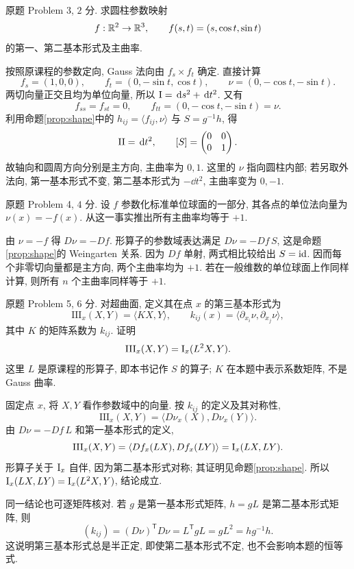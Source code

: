 \begin{exercise}\label{ps:4-3}
原题 Problem 3, $2$ 分. 求圆柱参数映射
\[
 f:\mathbb R^2\to\mathbb R^3,\qquad f(s,t)=(s,\cos t,\sin t)
\]
的第一、第二基本形式及主曲率.
\end{exercise}
\begin{solution}
按照原课程的参数定向, Gauss 法向由 $f_s\times f_t$ 确定. 直接计算
\[
 f_s=(1,0,0),\qquad f_t=(0,-\sin t,\cos t),\qquad
 \nu=(0,-\cos t,-\sin t).
\]
两切向量正交且均为单位向量, 所以 $\mathrm{I}=\,\mathrm d s^2+\,\mathrm d t^2$. 又有
\[
 f_{ss}=f_{st}=0,\qquad f_{tt}=(0,-\cos t,-\sin t)=\nu.
\]
利用命题\ref{prop:shape}中的 $h_{ij}=\langle f_{ij},\nu\rangle$ 与 $S=g^{-1}h$, 得
\[
 \mathrm{II}=\,\mathrm d t^2,\qquad
 [S]=\begin{pmatrix}0&0\\0&1\end{pmatrix}.
\]
故轴向和圆周方向分别是主方向, 主曲率为 $0,1$. 这里的 $\nu$ 指向圆柱内部; 若另取外法向, 第一基本形式不变, 第二基本形式为 $-\dd t^2$, 主曲率变为 $0,-1$.
\end{solution}

\begin{exercise}\label{ps:4-4}
原题 Problem 4, $4$ 分. 设 $f$ 参数化标准单位球面的一部分, 其各点的单位法向量为 $\nu(x)=-f(x)$. 从这一事实推出所有主曲率均等于 $+1$.
\end{exercise}
\begin{solution}
由 $\nu=-f$ 得 $D\nu=-Df$. 形算子的参数域表达满足 $D\nu=-Df\,S$, 这是命题\ref{prop:shape}的 Weingarten 关系. 因为 $Df$ 单射, 两式相比较给出 $S=\operatorname{id}$. 因而每个非零切向量都是主方向, 两个主曲率均为 $+1$. 若在一般维数的单位球面上作同样计算, 则所有 $n$ 个主曲率同样等于 $+1$.
\end{solution}

\begin{exercise}\label{ps:4-5}
原题 Problem 5, $6$ 分. 对超曲面, 定义其在点 $x$ 的第三基本形式为
\[
 \mathrm{III}_x(X,Y)=\langle KX,Y\rangle,
 \qquad k_{ij}(x)=\langle\partial_{x_i}\nu,\partial_{x_j}\nu\rangle,
\]
其中 $K$ 的矩阵系数为 $k_{ij}$. 证明
\[
 \mathrm{III}_x(X,Y)=\mathrm{I}_x(L^2X,Y).
\]
这里 $L$ 是原课程的形算子, 即本书记作 $S$ 的算子; $K$ 在本题中表示系数矩阵, 不是 Gauss 曲率.
\end{exercise}
\begin{solution}
固定点 $x$, 将 $X,Y$ 看作参数域中的向量. 按 $k_{ij}$ 的定义及其对称性,
\[
 \mathrm{III}_x(X,Y)=\langle D\nu_x(X),D\nu_x(Y)\rangle.
\]
由 $D\nu=-Df\,L$ 和第一基本形式的定义,
\[
 \mathrm{III}_x(X,Y)
 =\langle Df_x(LX),Df_x(LY)\rangle
 =\mathrm{I}_x(LX,LY).
\]
形算子关于 $\mathrm{I}_x$ 自伴, 因为第二基本形式对称; 其证明见命题\ref{prop:shape}. 所以 $\mathrm{I}_x(LX,LY)=\mathrm{I}_x(L^2X,Y)$, 结论成立.

\par{}
同一结论也可逐矩阵核对. 若 $g$ 是第一基本形式矩阵, $h=gL$ 是第二基本形式矩阵, 则
\[
 (k_{ij})=(D\nu)^{\mathsf T}D\nu
 =L^{\mathsf T}gL=gL^2=h g^{-1}h.
\]
这说明第三基本形式总是半正定, 即使第二基本形式不定, 也不会影响本题的恒等式.
\end{solution}
